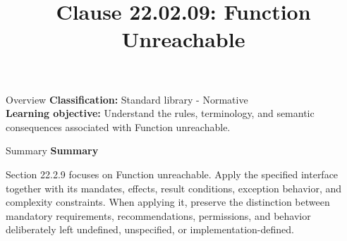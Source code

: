 \documentclass[10pt,letterpaper]{article}
\title{Clause 22.02.09: Function Unreachable}
\author{}
\date{}
\begin{document}
\maketitle
\begin{CornellOverviewBox}{Overview}
\textbf{Classification:} Standard library - Normative\\[2pt]
\textbf{Learning objective:} Understand the rules, terminology, and semantic consequences associated with Function unreachable.
\end{CornellOverviewBox}\begin{CornellSummaryBox}{Summary}
{\sffamily\bfseries\color{Accent} Summary}\par\vspace{3pt}Section 22.2.9 focuses on Function unreachable. Apply the specified interface together with its mandates, effects, result conditions, exception behavior, and complexity constraints. When applying it, preserve the distinction between mandatory requirements, recommendations, permissions, and behavior deliberately left undefined, unspecified, or implementation-defined.
\end{CornellSummaryBox}
\end{document}
